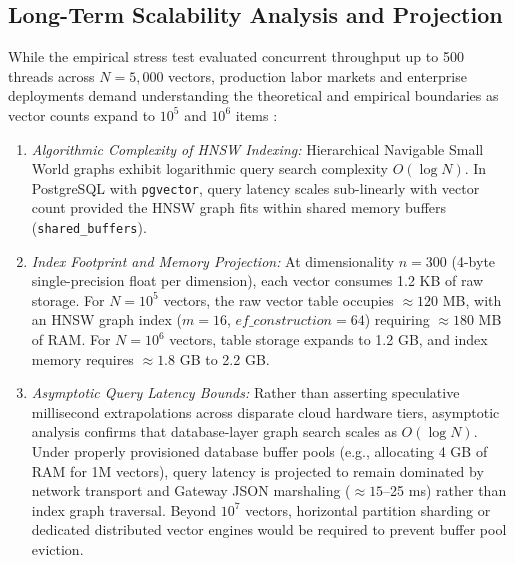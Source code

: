 \documentclass[a4paper,fleqn]{cas-dc}
\begin{document}
\subsection{Long-Term Scalability Analysis and Projection}
While the empirical stress test evaluated concurrent throughput up to 500 threads across $N = 5,000$ vectors, production labor markets and enterprise deployments demand understanding the theoretical and empirical boundaries as vector counts expand to $10^5$ and $10^6$ items \cite{alboqmi2025}:
\begin{enumerate}
    \item \textit{Algorithmic Complexity of HNSW Indexing:} Hierarchical Navigable Small World graphs exhibit logarithmic query search complexity $O(\log N)$. In PostgreSQL with \texttt{pgvector}, query latency scales sub-linearly with vector count provided the HNSW graph fits within shared memory buffers (\texttt{shared\_buffers}).
    \item \textit{Index Footprint and Memory Projection:} At dimensionality $n = 300$ (4-byte single-precision float per dimension), each vector consumes 1.2 KB of raw storage. For $N = 10^5$ vectors, the raw vector table occupies $\approx 120$ MB, with an HNSW graph index ($m = 16$, $ef\_construction = 64$) requiring $\approx 180$ MB of RAM. For $N = 10^6$ vectors, table storage expands to 1.2 GB, and index memory requires $\approx 1.8$ GB to 2.2 GB.
    \item \textit{Asymptotic Query Latency Bounds:} Rather than asserting speculative millisecond extrapolations across disparate cloud hardware tiers, asymptotic analysis confirms that database-layer graph search scales as $O(\log N)$. Under properly provisioned database buffer pools (e.g., allocating 4 GB of RAM for 1M vectors), query latency is projected to remain dominated by network transport and Gateway JSON marshaling ($\approx 15$--25 ms) rather than index graph traversal. Beyond $10^7$ vectors, horizontal partition sharding or dedicated distributed vector engines would be required to prevent buffer pool eviction.
\end{enumerate}
\end{document}
